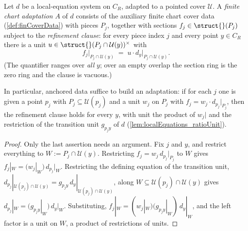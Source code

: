 \begin{definition}
  \label{def:divisorAdaptation}
  \leanok
  Let \(d\) be a local-equation system on \(C_R\), adapted to a pointed cover
  \(\mathcal U\). A \emph{finite chart adaptation} \(A\) of \(d\) consists of the auxiliary
  finite chart cover data (\ref{def:finCoverData}) with pieces \(P_j\), together with sections
  \(f_j \in \struct{}(P_j)\) subject to the \emph{refinement clause}: for every piece index
  \(j\) and every point \(y \in C_R\) there is a unit
  \(u \in \struct{}(P_j \cap \mathcal U(y))^{\times}\) with
  \[
    f_j\big|_{P_j \cap \mathcal U(y)} \;=\; u \cdot d_y\big|_{P_j \cap \mathcal U(y)} .
  \]
  (The quantifier ranges over \emph{all} \(y\); over an empty overlap the section ring is
  the zero ring and the clause is vacuous.)

  In particular, anchored data suffice to build an adaptation: if for each \(j\) one is
  given a point \(p_j\) with \(P_j \subseteq \mathcal U(p_j)\) and a unit \(w_j\) on
  \(P_j\) with \(f_j = w_j \cdot d_{p_j}|_{P_j}\), then the refinement clause holds for
  every \(y\), with unit the product of \(w_j|\) and the restriction of the transition unit
  \(g_{p_j y}\) of \(d\) (\ref{lem:localEquations_ratioUnit}).
\end{definition}
\begin{proof}
  \leanok
  Only the last assertion needs an argument. Fix \(j\) and \(y\), and restrict everything
  to \(W := P_j \cap \mathcal U(y)\). Restricting \(f_j = w_j\, d_{p_j}|_{P_j}\) to \(W\)
  gives \(f_j|_W = (w_j|_W)\, d_{p_j}|_W\). Restricting the defining equation of the
  transition unit, \(d_{p_j}|_{\mathcal U(p_j) \cap \mathcal U(y)} = g_{p_j y}\,
  d_y|_{\mathcal U(p_j)\cap\mathcal U(y)}\), along \(W \subseteq \mathcal U(p_j) \cap
  \mathcal U(y)\) gives \(d_{p_j}|_W = (g_{p_j y}|_W)\, d_y|_W\). Substituting,
  \(f_j|_W = (w_j|_W)(g_{p_j y}|_W)\, d_y|_W\), and the left factor is a unit on \(W\), a
  product of restrictions of units.
\end{proof}

